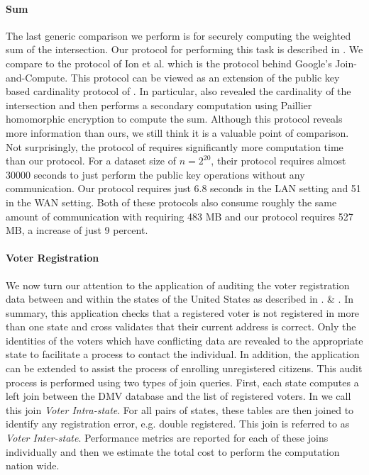 \paragraph{Sum} The last generic comparison we perform is for securely computing the weighted sum of the intersection. Our protocol for performing this task is described in . We compare to the protocol of Ion et al. \cite{cryptoeprint:2017:738} which is the protocol behind Google's Join-and-Compute. This protocol can be viewed as an extension of the public key based cardinality protocol of \cite{DBLP:conf/cans/CristofaroGT12}. In particular, \cite{cryptoeprint:2017:738}  also revealed the cardinality of the intersection and then performs a secondary computation using Paillier homomorphic encryption to compute the sum. Although this protocol reveals more information than ours, we still think it is a valuable point of comparison. Not surprisingly,  the protocol of \cite{cryptoeprint:2017:738} requires significantly more computation time than our protocol. For a dataset size of $n=2^{20}$, their protocol requires almost 30000 seconds to just perform the public key operations without any communication. Our protocol requires just 6.8 seconds in the LAN setting and 51 in the WAN setting. Both of these protocols also consume roughly the same amount of communication with \cite{cryptoeprint:2017:738} requiring 483 MB and our protocol requires 527 MB, a increase of just 9 percent. 

\paragraph{Voter Registration} We now turn our attention to the application of auditing the voter registration data between and within the states of the United States as described in 
\iffullversion
{}.
\else
{} \& . 
\fi
In summary, this application checks that a registered voter is not registered in more than one state and cross validates that their current address is correct. Only the identities of the voters which have conflicting data are revealed to the appropriate state to facilitate a process to contact the individual. In addition, the application can be extended to assist the process of enrolling unregistered citizens. This audit process is performed using two types of join queries. First, each state computes a left join between the DMV database and the list of registered voters. In  we call this join \emph{Voter Intra-state}. For all pairs of states, these tables are then joined to identify any registration error, e.g. double registered. This join is referred to as \emph{Voter Inter-state}. Performance metrics are reported for each of these joins individually and then we estimate the total cost to perform the computation nation wide. 

